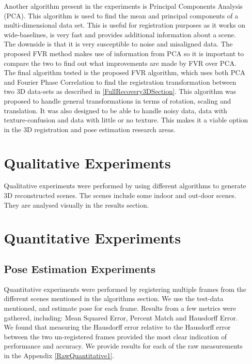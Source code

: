 Another algorithm present in the experiments is Principal Components Analysis (PCA). This algorithm is used to find the mean and principal components of a multi-dimensional data set. This is useful for registration purposes as it works on wide-baselines, is very fast and provides additional information about a scene. The downside is that it is very susceptible to noise and misaligned data. The proposed FVR method makes use of information from PCA so it is important to compare the two to find out what improvements are made by FVR over PCA. \\

The final algorithm tested is the proposed FVR algorithm, which uses both PCA and Fourier Phase Correlation to find the registration transformation between two 3D data-sets as described in \ref{FullRecovery3DSection}. This algorithm was proposed to handle general transformations in terms of rotation, scaling and translation. It was also designed to be able to handle noisy data, data with texture-confusion and data with little or no texture. This makes it a viable option in the 3D registration and pose estimation research areas.

\section{Qualitative Experiments}

\label{QualExperimentsSection}

Qualitative experiments were performed by using different algorithms to generate 3D reconstructed scenes. The scenes include some indoor and out-door scenes. They are analysed visually in the results section. 

\section{Quantitative Experiments}

\subsection{Pose Estimation Experiments}

Quantitative experiments were performed by registering multiple frames from the different scenes mentioned in the algorithms section. We use the test-data mentioned, and estimate pose for each frame. Results from a few metrics were gathered, including: Mean Squared Error, Percent Match and Hausdorff Error. We found that measuring the Hausdorff error relative to the Hausdorff error between the two un-registered frames provided the most clear indication of performance and accuracy. We provide results for each of the raw measurements in the Appendix \ref{RawQuantitative1}.


